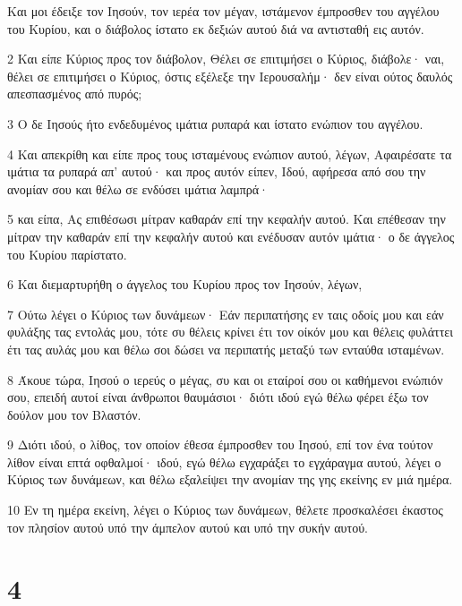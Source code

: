 \par Και μοι έδειξε τον Ιησούν, τον ιερέα τον μέγαν, ιστάμενον έμπροσθεν του αγγέλου του Κυρίου, και ο διάβολος ίστατο εκ δεξιών αυτού διά να αντισταθή εις αυτόν.
\par 2 Και είπε Κύριος προς τον διάβολον, Θέλει σε επιτιμήσει ο Κύριος, διάβολε· ναι, θέλει σε επιτιμήσει ο Κύριος, όστις εξέλεξε την Ιερουσαλήμ· δεν είναι ούτος δαυλός απεσπασμένος από πυρός;
\par 3 Ο δε Ιησούς ήτο ενδεδυμένος ιμάτια ρυπαρά και ίστατο ενώπιον του αγγέλου.
\par 4 Και απεκρίθη και είπε προς τους ισταμένους ενώπιον αυτού, λέγων, Αφαιρέσατε τα ιμάτια τα ρυπαρά απ' αυτού· και προς αυτόν είπεν, Ιδού, αφήρεσα από σου την ανομίαν σου και θέλω σε ενδύσει ιμάτια λαμπρά·
\par 5 και είπα, Ας επιθέσωσι μίτραν καθαράν επί την κεφαλήν αυτού. Και επέθεσαν την μίτραν την καθαράν επί την κεφαλήν αυτού και ενέδυσαν αυτόν ιμάτια· ο δε άγγελος του Κυρίου παρίστατο.
\par 6 Και διεμαρτυρήθη ο άγγελος του Κυρίου προς τον Ιησούν, λέγων,
\par 7 Ούτω λέγει ο Κύριος των δυνάμεων· Εάν περιπατήσης εν ταις οδοίς μου και εάν φυλάξης τας εντολάς μου, τότε συ θέλεις κρίνει έτι τον οίκόν μου και θέλεις φυλάττει έτι τας αυλάς μου και θέλω σοι δώσει να περιπατής μεταξύ των ενταύθα ισταμένων.
\par 8 Άκουε τώρα, Ιησού ο ιερεύς ο μέγας, συ και οι εταίροί σου οι καθήμενοι ενώπιόν σου, επειδή αυτοί είναι άνθρωποι θαυμάσιοι· διότι ιδού εγώ θέλω φέρει έξω τον δούλον μου τον Βλαστόν.
\par 9 Διότι ιδού, ο λίθος, τον οποίον έθεσα έμπροσθεν του Ιησού, επί τον ένα τούτον λίθον είναι επτά οφθαλμοί· ιδού, εγώ θέλω εγχαράξει το εγχάραγμα αυτού, λέγει ο Κύριος των δυνάμεων, και θέλω εξαλείψει την ανομίαν της γης εκείνης εν μιά ημέρα.
\par 10 Εν τη ημέρα εκείνη, λέγει ο Κύριος των δυνάμεων, θέλετε προσκαλέσει έκαστος τον πλησίον αυτού υπό την άμπελον αυτού και υπό την συκήν αυτού.

\chapter{4}

